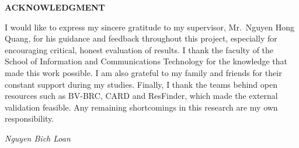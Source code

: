 \documentclass[../main.tex]{subfiles}
\begin{document}
\begin{center}
    \Large{\textbf{ACKNOWLEDGMENT}}\\
\end{center}
\vspace{1cm}
I would like to express my sincere gratitude to my supervisor, Mr.\ Nguyen Hong Quang, for his guidance and feedback throughout this project, especially for encouraging critical, honest evaluation of results. I thank the faculty of the School of Information and Communications Technology for the knowledge that made this work possible. I am also grateful to my family and friends for their constant support during my studies. Finally, I thank the teams behind open resources such as BV-BRC, CARD and ResFinder, which made the external validation feasible. Any remaining shortcomings in this research are my own responsibility.

\begin{flushright}
\textit{Nguyen Bich Loan}
\end{flushright}
\end{document}
